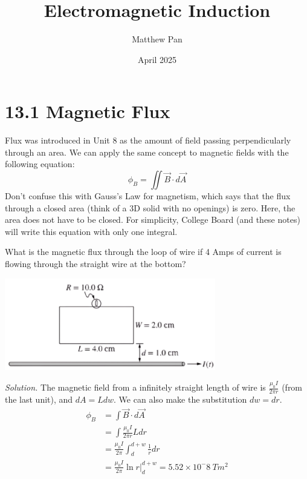 \documentclass[12pt, titlepage]{article}
\title{Electromagnetic Induction}
\author{Matthew Pan}
\date{April 2025}
\begin{document}
\pagestyle{fancy}

\fancyhead{}
\fancyhead[R]{\thepage}

\maketitle

\section*{13.1 Magnetic Flux}

Flux was introduced in Unit 8 as the amount of field passing perpendicularly through an area. We can apply the same concept to magnetic fields with the following equation:
\begin{equation*}
    \phi_B = \iint \vec{B} \cdot d\vec{A}
\end{equation*}
Don't confuse this with Gauss's Law for magnetism, which says that the flux through a closed area (think of a 3D solid with no openings) is zero. Here, the area does not have to be closed. For simplicity, College Board (and these notes) will write this equation with only one integral.

\begin{Problem}
    What is the magnetic flux through the loop of wire if 4 Amps of current is flowing through the straight wire at the bottom?
    \begin{center}
        \includegraphics*[height=4cm]{media/flux.png}
    \end{center}

    \tcblower
    \textit{Solution. }
    The magnetic field from a infinitely straight length of wire is $\frac{\mu_0 I}{2\pi r}$ (from the last unit), and $dA=Ldw$. We can also make the substitution $dw=dr$.
    \begin{align*}
        \phi_B &= \int \vec{B} \cdot d\vec{A} \\
        &= \int \frac{\mu_0 I}{2\pi r}L dr \\
        &= \frac{\mu_0 I}{2\pi} \int_{d}^{d+w} \frac{1}{r} dr \\
        & = \frac{\mu_0 I}{2\pi} \ln r |_{d}^{d+w} = 5.52 \times 10^-8 \ Tm^2
    \end{align*}
\end{Problem}
\end{document}
